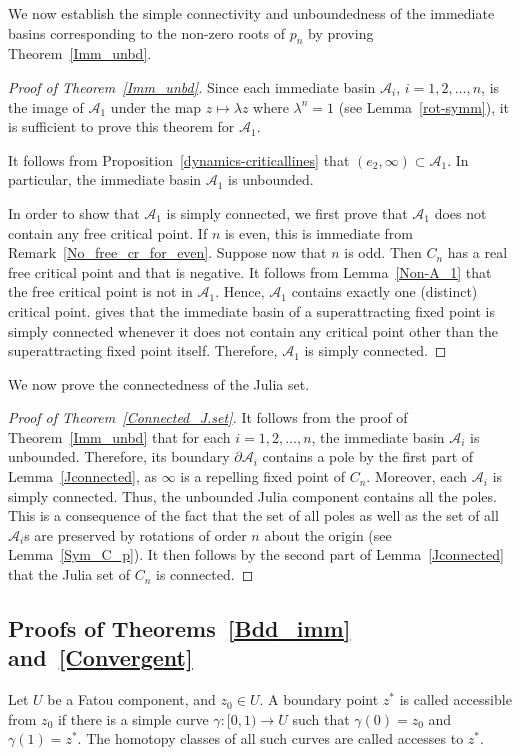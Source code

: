 \documentclass[12pt]{article}
\begin{document}
 We now establish the simple connectivity and unboundedness of the immediate basins corresponding to the non-zero roots of $p_n$ by proving Theorem~\ref{Imm_unbd}. 
	
	\begin{proof}[Proof of Theorem~\ref{Imm_unbd}]
		Since each immediate basin $\mathcal{A}_i$, $i=1,2,\dots, n$, is the image of $\mathcal{A}_1$ under the map $z \mapsto \lambda z$ where ${\lambda}^n=1$ (see Lemma~\ref{rot-symm}), it is sufficient to prove this theorem for $\mathcal{A}_1$.
		\par It follows from Proposition~\ref{dynamics-criticallines} that $(e_2, \infty) \subset \mathcal{A}_1$. In particular, the immediate basin $\mathcal{A}_1$ is unbounded. 
		
		\par In order to show that $\mathcal{A}_1$ is simply connected, we first prove that $\mathcal{A}_1$ does not contain any free critical point. If $n$ is even, this is immediate from Remark~\ref{No_free_cr_for_even}. Suppose now that $n$ is odd. Then $C_n$ has a real free critical point and that is negative. It follows from Lemma~\ref{Non-A_1} that the free critical point is not in $\mathcal{A}_1$. Hence, $\mathcal{A}_1$ contains exactly one (distinct) critical point. \cite[Theorem~9.3]{Milnor_book} gives that the immediate basin of a superattracting fixed point is simply connected whenever it does not contain any critical point other than the superattracting fixed point itself. Therefore, $\mathcal{A}_1$ is simply connected.
	\end{proof}
 We now prove the connectedness of the Julia set.
	\begin{proof}[Proof of Theorem~\ref{Connected_J.set}]
		It follows from the proof of Theorem~\ref{Imm_unbd} that for each $i=1,2,\dots, n$, the immediate basin $\mathcal{A}_i$ is unbounded. Therefore, its boundary $\partial \mathcal{A}_i$ contains a pole by the first part of Lemma~\ref{Jconnected}, as $\infty$ is a repelling fixed point of $C_n$. Moreover, each $\mathcal{A}_i$ is simply connected. Thus, the unbounded Julia component contains all the poles. This is a consequence of the fact that the set of all poles as well as the set of all $\mathcal{A}_i$s are preserved by rotations of order $n$ about the origin (see Lemma~\ref{Sym_C_p}).  It then follows by the second part of Lemma~\ref{Jconnected} that the Julia set of $C_n$ is connected.
	\end{proof}
\subsection{Proofs of Theorems~\ref{Bdd_imm} and~\ref{Convergent}}
 Let $U$ be a Fatou component, and $z_0\in U$. A boundary point $z^*$ is called accessible from $z_0$ if there is a simple curve $\gamma:[0,1)\to U$ such that $\gamma(0)=z_0$ and $\gamma(1)=z^*$. The homotopy classes of all such curves are called accesses to $z^*$.
\end{document}
